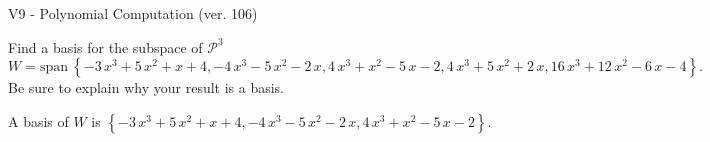 \begin{exercise}
  \begin{exerciseTitle}V9 - Polynomial Computation (ver. 106)\end{exerciseTitle}
  \begin{exerciseStatement}
    Find a basis for the subspace of \(\mathcal{P}^3\) 
\[W=\mathrm{span}\ \left\{-3 \, x^{3} + 5 \, x^{2} + x + 4 , -4 \, x^{3} - 5 \, x^{2} - 2 \, x , 4 \, x^{3} + x^{2} - 5 \, x - 2 , 4 \, x^{3} + 5 \, x^{2} + 2 \, x , 16 \, x^{3} + 12 \, x^{2} - 6 \, x - 4\right\}.\]
 Be sure to explain why your result is a basis.


  \end{exerciseStatement}
  \begin{exerciseAnswer}
   A basis of \(W\) is  \(\left\{-3 \, x^{3} + 5 \, x^{2} + x + 4 , -4 \, x^{3} - 5 \, x^{2} - 2 \, x , 4 \, x^{3} + x^{2} - 5 \, x - 2\right\}\).
  


  \end{exerciseAnswer}
\end{exercise}